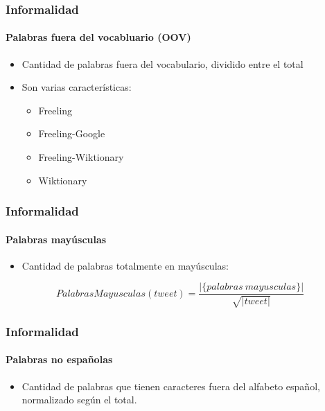 \begin{frame}
    \frametitle{Informalidad}
    \framesubtitle{Palabras fuera del vocabluario (OOV)}

    \begin{itemize}
        \item Cantidad de palabras fuera del vocabulario, dividido entre el total
        \item Son varias características:
        \begin{itemize}
            \item Freeling
            \item Freeling-Google
            \item Freeling-Wiktionary
            \item Wiktionary
        \end{itemize}
    \end{itemize}
\end{frame}

\begin{frame}
    \frametitle{Informalidad}
    \framesubtitle{Palabras mayúsculas}

    \begin{itemize}
        \item Cantidad de palabras totalmente en mayúsculas:
    \end{itemize}

    \begin{center}
        \[
            PalabrasMayusculas(tweet) = \frac{|\{palabras\ mayusculas\}|}{\sqrt{|tweet|}}
        \]
    \end{center}
\end{frame}

\begin{frame}
    \frametitle{Informalidad}
    \framesubtitle{Palabras no españolas}

    \begin{itemize}
        \item Cantidad de palabras que tienen caracteres fuera del alfabeto español, normalizado según el total.
    \end{itemize}
\end{frame}

